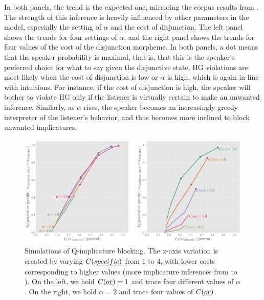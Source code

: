 \documentclass[12pt,twoside]{article}
\renewcommand{\_}{\textbf{\textunderscore\hspace{-4pt}\textunderscore\hspace{-3pt}\textunderscore\hspace{-4pt}\textunderscore}\hspace{0.5pt}}			%
\begin{document}
In both panels, the trend is the expected one, mirroring the corpus
results from . The strength of this inference is
heavily influenced by other parameters in the model, especially the
setting of $\alpha$ and the cost of disjunction. The left panel shows
the trends for four settings of $\alpha$, and the right panel shows
the trends for four values of the cost of the disjunction morpheme. In
both panels, a dot means that the speaker probability is maximal, that
is, that this is the speaker's preferred choice for what to say given
the disjunctive state. HG violations are most likely when the cost of
disjunction is low or $\alpha$ is high, which is again in-line with
intuitions. For instance, if the cost of disjunction is high, the
speaker will bother to violate HG only if the listener is virtually
certain to make an unwanted inference. Similarly, as $\alpha$ rises,
the speaker becomes an increasingly greedy interpreter of the
listener's behavior, and thus becomes more inclined to block unwanted
implicatures.

\begin{figure}[tp]
  \centering
  \includegraphics[width=1\textwidth]{fig/Q-implicature-simulation}  
  \caption{Simulations of Q-implicature blocking. The x-axis variation is 
    created by varying $C(\emph{specific})$ from $1$ to $4$, with lower
    costs corresponding to higher values (more implicature inferences
    from  to ).  On the left, we hold
    $C(\emph{or}) =1$ and trace four different values of
    $\alpha$. On the right, we hold $\alpha=2$ and trace four values
    of $C(\emph{or})$.}
  \label{fig:qsims}
\end{figure}
\end{document}
